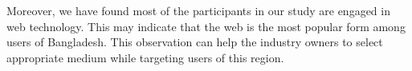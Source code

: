 Moreover, we have found most of the participants in our study are engaged in web technology. This may indicate that the web is the most popular form among users of Bangladesh. This observation can help the industry owners to select appropriate medium while targeting users of this region. %
